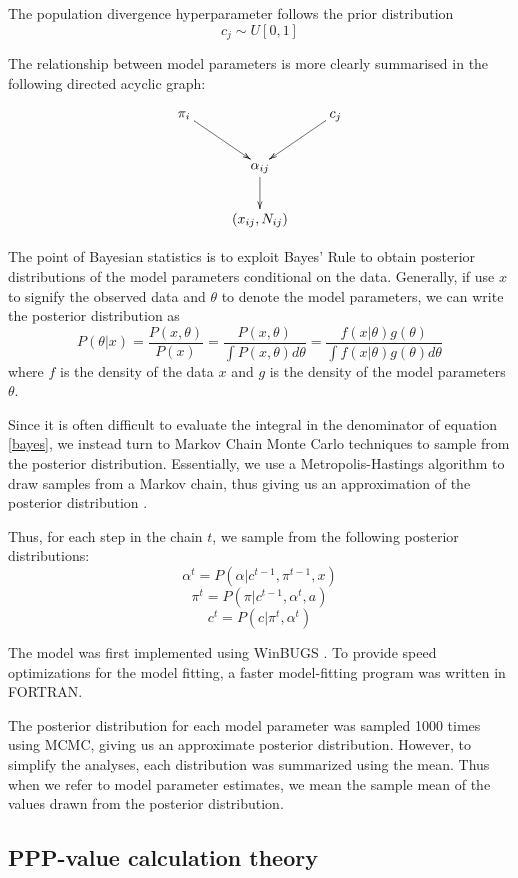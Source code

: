 \documentclass[a4paper,12pt]{article}
\begin{document}
The population divergence hyperparameter follows the prior
distribution $$c_j\sim U[0,1]$$

The relationship between model parameters is more clearly summarised
in the following directed acyclic graph:

$$
\xymatrix{
  \pi_i \ar[rd] & & c_j \ar[ld] \\
  & \alpha_{ij} \ar[d] & \\
  & (x_{ij},N_{ij})
}
$$

The point of Bayesian statistics is to exploit Bayes' Rule to obtain
posterior distributions of the model parameters conditional on the
data. Generally, if use $x$ to signify the observed data and $\theta$
to denote the model parameters, we can write the posterior
distribution as
\begin{equation}
\label{bayes}
P(\theta|x) = \frac{P(x,\theta)}{P(x)} = 
\frac{P(x,\theta)}{\int P(x,\theta)d\theta} =
\frac{f(x|\theta)g(\theta)}{\int f(x|\theta)g(\theta)d\theta}
\end{equation}
where $f$ is the density of the data $x$ and $g$ is the density of the
model parameters $\theta$.

Since it is often difficult to evaluate the integral in the
denominator of equation \ref{bayes}, we instead turn to Markov Chain
Monte Carlo techniques to sample from the posterior
distribution. Essentially, we use a Metropolis-Hastings algorithm to
draw samples from a Markov chain, thus giving us an approximation of
the posterior distribution \cite{hastings}.

Thus, for each step in the chain $t$, we sample from the following
posterior distributions:
$$\alpha^t = P(\alpha|c^{t-1},\pi^{t-1},x)$$
$$\pi^t = P(\pi|c^{t-1},\alpha^t,a)$$
$$c^t = P(c|\pi^t,\alpha^t)$$

The model was first implemented using WinBUGS \cite{winbugs}. To
provide speed optimizations for the model fitting, a faster
model-fitting program was written in FORTRAN.

The posterior distribution for each model parameter was sampled 1000
times using MCMC, giving us an approximate posterior
distribution. However, to simplify the analyses, each distribution was
summarized using the mean. Thus when we refer to model parameter
estimates, we mean the sample mean of the values drawn from the
posterior distribution.

\subsection{PPP-value calculation theory}
\end{document}
